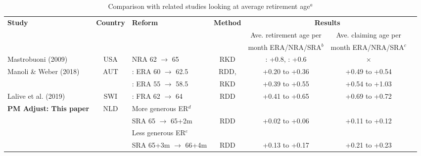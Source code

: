 \documentclass[12pt,a4paper]{article}
\begin{document}
\begin{table}[h]
	\begin{adjustwidth}{-0.25in}{-0.25in}	
	\scriptsize
	\caption{Comparison with related studies looking at average retirement age$^a$}
	\label{comparison_ave}
	\begin{tabular}{lclc ccc}		
		
		\toprule
		
		\textbf{Study} & \textbf{Country} & \multicolumn{1}{l}{\textbf{Reform}} & \multicolumn{1}{c}{\textbf{Method}}   &  \multicolumn{2}{c}{\textbf{Results}} \\	
		&                             &              &                 &   Ave. retirement age per & Ave. claiming age per \\
		&                             &              &                 &   month ERA/NRA/SRA$^b$ & month ERA/NRA/SRA$^c$ \\
		\midrule
		
		Mastrobuoni (2009) &
		USA &  NRA 62 $\rightarrow$ 65 & 
                     RKD &
		\male: +0.8, \female: +0.6 & $\times$ \\
		
		Manoli \& Weber (2018) &
		AUT & \male: ERA 60 $\rightarrow$ 62.5 &  
                     RDD, & 
		+0.20 to +0.36 & +0.49 to +0.54 \\
		& & \female: ERA 55 $\rightarrow$ 58.5 &  
		RKD &  
		+0.39 to +0.55 & +0.54 to +1.03 \\
		
		Lalive et al. (2019) & 
		SWI & \female: FRA 62 $\rightarrow$ 64 & 
		RDD &
		+0.41 to +0.65 & +0.69 to +0.72\\
		
		\textbf{PM Adjust: This paper} &  %
		NLD & More generous ER$^d$  \\
                            & & SRA 65 $\rightarrow$ 65+2m & RDD & +0.02 to +0.06  & +0.11 to +0.12 \\ 
		  & & Less generous ER$^e$ \\
                         & & SRA 65+3m $\rightarrow$ 66+4m  & RDD & +0.13 to +0.17 & +0.21 to +0.23  \\ 	
		

\end{tabular}
\end{adjustwidth}
\end{table}
\end{document}
